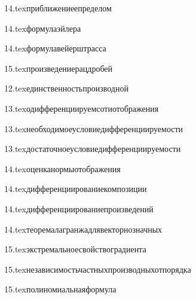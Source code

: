 {14.tex}{приближениеепределом}

{14.tex}{формулаэйлера}

{14.tex}{формулавейерштрасса}

{15.tex}{произведениерацдробей}

{12.tex}{единственностьпроизводной}

{13.tex}{одифференциируемсотиотображения}

{13.tex}{необходимоеусловиедифференциируемости}

{13.tex}{достаточноеусловиедифференциируемости}

{14.tex}{оценканормыотображения}

{14.tex}{дифференциированиекомпозиции}

{14.tex}{дифференциированиепроизведений}

{14.tex}{теоремалагранжадлявекторнозначных}

{15.tex}{экстремальноесвойствоградиента}

{15.tex}{независимостьчастныхпроизводныхотпорядка}

{15.tex}{полиномиальнаяформула}


